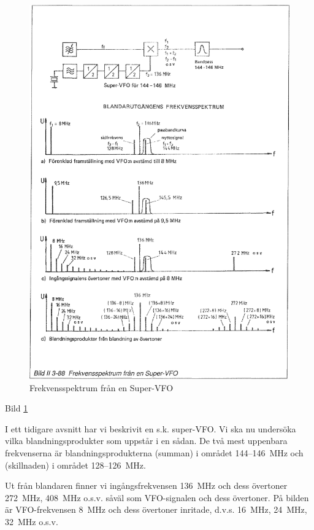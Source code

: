 \begin{figure}
\includegraphics[width=\textwidth]{images/bild_2_3-88}
\caption{Frekvensspektrum från en Super-VFO}
\label{fig:BildII3-88}
\end{figure}

Bild \ref{fig:BildII3-88}

I ett tidigare avsnitt har vi beskrivit en s.k.  super-VFO. Vi ska
nu undersöka vilka blandningsprodukter som uppstår i en sådan. De två
mest uppenbara frekvenserna är blandningsprodukterna (summan) i
området 144--146~MHz och (skillnaden) i området 128--126~MHz.

Ut från blandaren finner vi ingångsfrekvensen 136~MHz och dess
övertoner 272~MHz, 408~MHz o.s.v. såväl som VFO-signalen och dess
övertoner. På bilden är VFO-frekvensen 8~MHz och dess övertoner
inritade, d.v.s. 16~MHz, 24~MHz, 32~MHz o.s.v.

